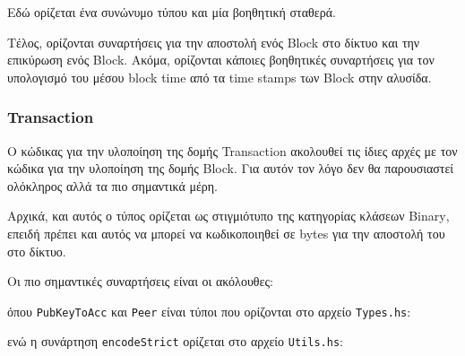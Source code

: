 \documentclass{article}
\newcommand{\eng}[1]{\foreignlanguage{english}{#1}} %
\begin{document}
Εδώ ορίζεται ένα συνώνυμο τύπου και μία βοηθητική σταθερά.

    

Τέλος, ορίζονται συναρτήσεις για την αποστολή ενός \eng{Block} στο δίκτυο και την
επικύρωση ενός \eng{Block}. Ακόμα, ορίζονται κάποιες βοηθητικές συναρτήσεις για τον
υπολογισμό του μέσου \eng{block time} από τα \eng{time stamps} των \eng{Block} στην
αλυσίδα.
    
\FloatBarrier

\subsubsection{\eng{Transaction}}

Ο κώδικας για την υλοποίηση της δομής \eng{Transaction} ακολουθεί τις ίδιες αρχές με
τον κώδικα για την υλοποίηση της δομής \eng{Block}. Για αυτόν τον λόγο δεν θα παρουσιαστεί
ολόκληρος αλλά τα πιο σημαντικά μέρη.

Αρχικά, και αυτός ο τύπος ορίζεται ως στιγμιότυπο της κατηγορίας κλάσεων \eng{Binary}, επειδή
πρέπει και αυτός να μπορεί να κωδικοποιηθεί σε \eng{bytes} για την αποστολή του στο δίκτυο.

Οι πιο σημαντικές συναρτήσεις είναι οι ακόλουθες:

\begin{figure}[ht]
    
\end{figure}
\FloatBarrier

όπου \texttt{\eng{PubKeyToAcc}} και \texttt{\eng{Peer}} είναι τύποι που ορίζονται στο
αρχείο \texttt{\eng{Types.hs}}:

\begin{figure}[ht]
    
\end{figure}
\FloatBarrier

ενώ η συνάρτηση \texttt{\eng{encodeStrict}} ορίζεται στο αρχείο \texttt{\eng{Utils.hs}}:
\end{document}
